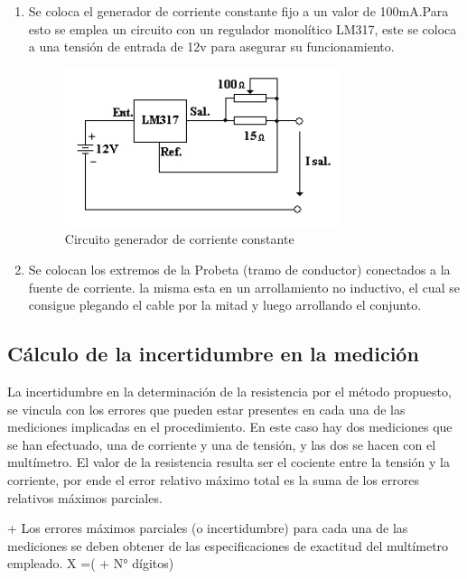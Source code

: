 \documentclass[12pt, letterpaper]{article}
\begin{document}
\begin{enumerate}
	\item Se coloca el generador de corriente constante fijo a un valor de 100mA.Para esto se emplea un circuito con un regulador monolítico
	LM317, este se coloca a una tensión de entrada de 12v para asegurar su funcionamiento.
	
	\begin{figure}[H]
		\centering
		\includegraphics{imagenes/circuito_lm317.jpg}
		\caption{Circuito generador de corriente constante}
        \label{fig.gen_corriente}
	\end{figure}

	\item Se colocan los extremos de la Probeta (tramo de conductor) conectados a la fuente de corriente. la misma esta en un 
	arrollamiento no inductivo, el cual se consigue plegando el cable por la mitad y luego arrollando el conjunto.
\end{enumerate}

\subsection{Cálculo de la incertidumbre en la medición}

La incertidumbre en la determinación de la resistencia por el método propuesto, se vincula con los 
errores que pueden estar presentes en cada una de las mediciones implicadas en el procedimiento. En 
este caso hay dos mediciones que se han efectuado, una de corriente y una de tensión, y las dos se 
hacen con el multímetro. El valor de la resistencia resulta ser el cociente entre la tensión y la 
corriente, por ende el error relativo máximo total es la suma de los errores relativos máximos parciales.
\singlespacing

+
\newline
Los errores máximos parciales (o incertidumbre) para cada una de las mediciones se deben 
obtener de las especificaciones de exactitud del multímetro empleado. 
\newline
\Delta X =(  + N° dígitos)\\
\end{document}
